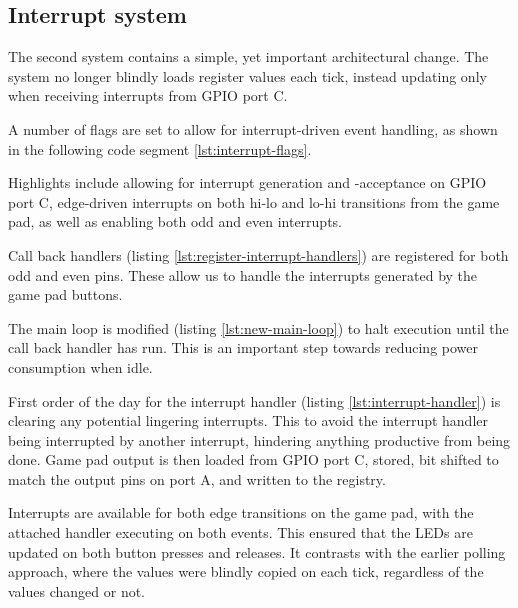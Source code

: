 \subsection{Interrupt system}

The second system contains a simple, yet important architectural change. The system no longer blindly loads register values each tick, instead updating only when receiving interrupts from GPIO port C.

A number of flags are set to allow for interrupt-driven event handling, as shown in the following code segment \ref{lst:interrupt-flags}.

Highlights include allowing for interrupt generation and -acceptance on GPIO port C, edge-driven interrupts on both hi-lo and lo-hi transitions from the game pad, as well as enabling both odd and even interrupts.



Call back handlers (listing \ref{lst:register-interrupt-handlers}) are registered for both odd and even pins. These allow us to handle the interrupts generated by the game pad buttons.



The main loop is modified (listing \ref{lst:new-main-loop}) to halt execution until the call back handler has run. This is an important step towards reducing power consumption when idle.



First order of the day for the interrupt handler (listing \ref{lst:interrupt-handler}) is clearing any potential lingering interrupts. This to avoid the interrupt handler being interrupted by another interrupt, hindering anything productive from being done.
Game pad output is then loaded from GPIO port C, stored, bit shifted to match the output pins on port A, and written to the registry.

Interrupts are available for both edge transitions on the game pad, with the attached handler executing on both events.
This ensured that the LEDs are updated on both button presses and releases. It contrasts with the earlier polling approach, where the values were blindly copied on each tick, regardless of the values changed or not.

